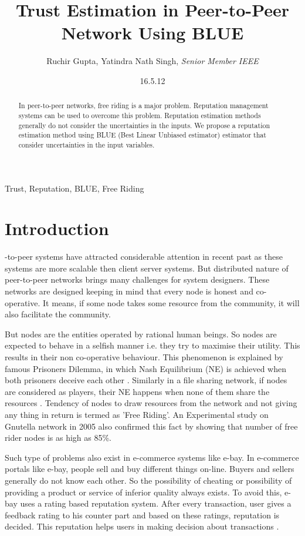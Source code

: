 \documentclass{IEEEtran}
\title{Trust Estimation in Peer-to-Peer Network Using BLUE}
\author{Ruchir Gupta, Yatindra Nath Singh, \emph{Senior Member IEEE}}
\affil{Department of Electrical Engineering, IIT, Kanpur}
\affil{\textit {\{rgupta,ynsingh\}@iitk.ac.in}}
\date{16.5.12}
\begin{document}
\maketitle
\begin{abstract}
In peer-to-peer networks, free riding is a major problem. Reputation management systems can be used to overcome this problem. Reputation estimation methods generally do not consider the uncertainties in the inputs.  We propose a reputation estimation method using BLUE (Best Linear Unbiased estimator) estimator that consider uncertainties in the input variables.
\end {abstract}
\begin{keywords}
Trust, Reputation, BLUE, Free Riding
\end{keywords} 
\section{Introduction}
-to-peer systems have attracted considerable attention in recent past as
these systems are more scalable then client server systems. But distributed
nature of peer-to-peer networks brings many challenges for system designers.
These networks are designed keeping in mind that every node is honest and co-operative. It means, if some node takes some resource from the community, it will also facilitate the community.

But nodes are the entities operated by rational human beings. So nodes are expected to behave in
a selfish manner i.e. they try to maximise their utility. This results in their
non co-operative behaviour. This phenomenon is explained by famous Prisoners
Dilemma, in which Nash Equilibrium (NE) is achieved when both prisoners deceive each other \cite{PD}. Similarly in a file sharing network, if nodes are considered as players, their NE happens when none of them share the resources \cite{Trust Based}.
Tendency of nodes to draw resources from the network and not giving any thing in
return is termed as 'Free Riding'. An Experimental
study\cite{Free Riding on Gnutella} on Gnutella network in 2005 also confirmed
this fact by showing that number of free rider nodes is as high as 85\%.

Such type of problems also exist in e-commerce systems like e-bay. In e-commerce portals like e-bay, people sell and buy different things on-line. Buyers and
sellers generally do not know each other. So the possibility of cheating or possibility of providing a product or service of inferior quality always exists. To avoid this, e-bay uses a rating based reputation system. After every transaction, user gives a feedback rating to his counter part and based on these ratings, reputation is decided. This reputation helps users in making decision about transactions \cite{ebay}.
\end{document}
